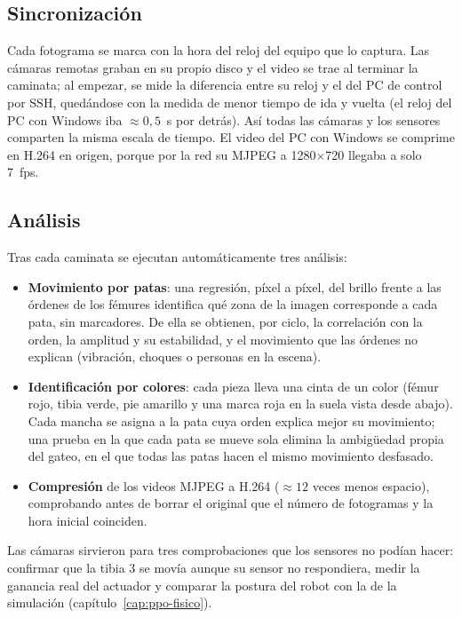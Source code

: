\subsection{Sincronización}

Cada fotograma se marca con la hora del reloj del equipo que lo captura. Las
cámaras remotas graban en su propio disco y el video se trae al terminar la
caminata; al empezar, se mide la diferencia entre su reloj y el del PC de
control por SSH, quedándose con la medida de menor tiempo de ida y vuelta (el
reloj del PC con Windows iba $\approx0{,}5$~s por detrás). Así todas las cámaras
y los sensores comparten la misma escala de tiempo. El video del PC con Windows
se comprime en H.264 en origen, porque por la red su MJPEG a 1280$\times$720
llegaba a solo 7~fps.

\subsection{Análisis}

Tras cada caminata se ejecutan automáticamente tres análisis:
\begin{itemize}
    \item \textbf{Movimiento por patas}: una regresión, píxel a píxel, del brillo
    frente a las órdenes de los fémures identifica qué zona de la imagen
    corresponde a cada pata, sin marcadores. De ella se obtienen, por ciclo, la
    correlación con la orden, la amplitud y su estabilidad, y el movimiento que
    las órdenes no explican (vibración, choques o personas en la escena).
    \item \textbf{Identificación por colores}: cada pieza lleva una cinta de un
    color (fémur rojo, tibia verde, pie amarillo y una marca roja en la suela
    vista desde abajo). Cada mancha se asigna a la pata cuya orden explica mejor
    su movimiento; una prueba en la que cada pata se mueve sola elimina la
    ambigüedad propia del gateo, en el que todas las patas hacen el mismo
    movimiento desfasado.
    \item \textbf{Compresión} de los videos MJPEG a H.264 ($\approx12$ veces
    menos espacio), comprobando antes de borrar el original que el número de
    fotogramas y la hora inicial coinciden.
\end{itemize}
Las cámaras sirvieron para tres comprobaciones que los sensores no podían hacer:
confirmar que la tibia 3 se movía aunque su sensor no respondiera, medir la
ganancia real del actuador y comparar la postura del robot con la de la
simulación (capítulo~\ref{cap:ppo-fisico}).

